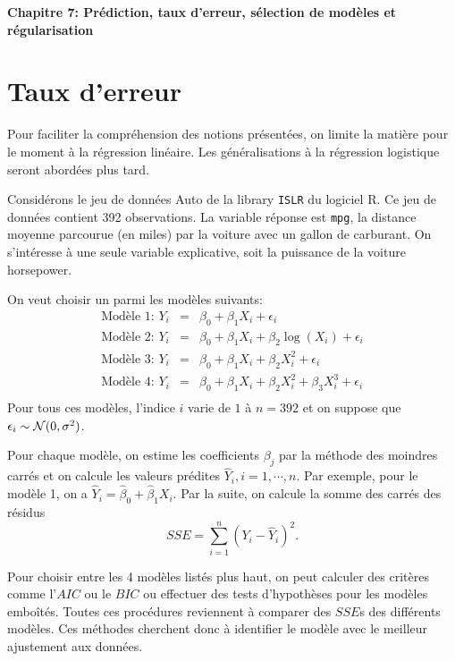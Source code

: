 \documentclass[11pt]{article}
\begin{document}
\begin{center}
{\textbf{\LARGE Chapitre 7: Pr\'ediction, taux d'erreur, s\'election de mod\`eles et r\'egularisation}}
\end{center}

\section{Taux d'erreur}

\noindent Pour faciliter la compr\'ehension des notions pr\'esent\'ees, on limite la mati\`ere pour le moment \`a la r\'egression lin\'eaire. Les g\'en\'eralisations \`a la r\'egression logistique seront abord\'ees plus tard.

\noindent Consid\'erons le jeu de donn\'ees \textsf{Auto} de la library \texttt{ISLR} du logiciel \textrm{R}. Ce jeu de donn\'ees contient 392 observations. La variable r\'eponse est \texttt{mpg}, la distance moyenne parcourue (en miles) par la voiture avec un gallon de carburant. On s'int\'eresse \`a une seule variable explicative, soit la puissance de la voiture \textrm{horsepower}.

\noindent On veut choisir un parmi les mod\`eles suivants: 
\begin{eqnarray*}
\mbox{Mod\`ele 1: } Y_i &=& \beta_0 + \beta_1 X_i + \epsilon_i  \\
\mbox{Mod\`ele 2: } Y_i &=& \beta_0 + \beta_1 X_i + \beta_2 \log(X_i) + \epsilon_i \\
\mbox{Mod\`ele 3: } Y_i &=& \beta_0 + \beta_1 X_i + \beta_2 X_i^2 + \epsilon_i \\
\mbox{Mod\`ele 4: } Y_i &=& \beta_0 + \beta_1 X_i + \beta_2 X_i^2 + \beta_3 X_i^3 + \epsilon_i \\
\end{eqnarray*}
\noindent Pour tous ces mod\`eles, l'indice $i$ varie de $1$ \`a $n=392$ et on suppose que $\epsilon_i \sim {\cal N}(0,\sigma^2)$.

\noindent Pour chaque mod\`ele, on estime les coefficients $\beta_j$ par la m\'ethode des moindres carr\'es et on calcule les valeurs pr\'edites $\hat Y_i, i=1,\cdots,n.$ Par exemple, pour le mod\`ele 1, on a $\hat Y_i = \hat\beta_0+\hat\beta_1 X_i$. Par la suite, on calcule la somme des carr\'es des r\'esidus $$SSE=\sum\limits_{i=1}^n (Y_i-\hat Y_i)^2.$$

\noindent Pour choisir entre les 4 mod\`eles list\'es plus haut, on peut calculer des crit\`eres comme l'$AIC$ ou le $BIC$ ou effectuer des tests d'hypoth\`eses pour les mod\`eles embo\^it\'es. Toutes ces proc\'edures reviennent \`a comparer des $SSE$s des diff\'erents mod\`eles. Ces m\'ethodes cherchent donc \`a identifier le mod\`ele avec le meilleur ajustement aux donn\'ees.
\end{document}
